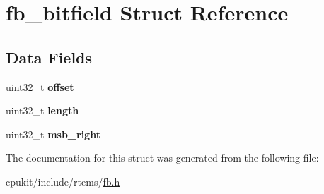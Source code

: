 \hypertarget{structfb__bitfield}{}\section{fb\+\_\+bitfield Struct Reference}
\label{structfb__bitfield}
\subsection*{Data Fields}
\begin{DoxyCompactItemize}
\item 
\mbox{\label{structfb__bitfield_a8c3f5dd88d0654bc82bf1266a3ae174c}} 
uint32\+\_\+t {\bfseries offset}
\item 
\mbox{\label{structfb__bitfield_a0305f2d4da30305ba667a3152f9fb0e0}} 
uint32\+\_\+t {\bfseries length}
\item 
\mbox{\label{structfb__bitfield_a660a398bd23cf251663533421cdf6a45}} 
uint32\+\_\+t {\bfseries msb\+\_\+right}
\end{DoxyCompactItemize}


The documentation for this struct was generated from the following file\+:\begin{DoxyCompactItemize}
\item 
cpukit/include/rtems/\mbox{\hyperlink{fb_8h}{fb.\+h}}\end{DoxyCompactItemize}
